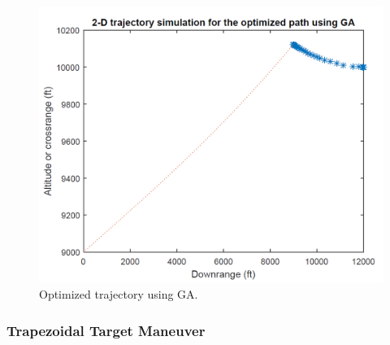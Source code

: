 \begin{figure}[H]
	\centering
	\includegraphics[scale = 0.4]{fig/polyTrajectory.PNG}
	\caption{Optimized trajectory using GA.}
	\label{GA poly trajectory}
\end{figure}



\subsubsection{Trapezoidal Target Maneuver}



